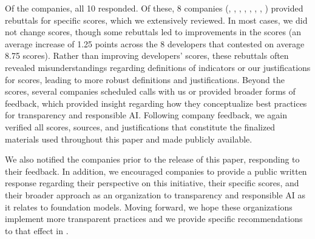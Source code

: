 Of the \numcompanies companies, all 10 responded.
Of these, 8 companies (\amazon, \anthropic, \cohere, \huggingface, \inflection, \meta, \openai, \stability) provided rebuttals for specific scores, which we extensively reviewed. 
In most cases, we did not change scores, though some rebuttals led to improvements in the scores (an average increase of 1.25 points across the 8 developers that contested on average 8.75 scores).
Rather than improving developers' scores, these rebuttals often revealed misunderstandings regarding definitions of indicators or our justifications for scores, leading to more robust definitions and justifications.
Beyond the scores, several companies scheduled calls with us or provided broader forms of feedback, which provided insight regarding how they conceptualize best practices for transparency and responsible AI.
Following company feedback, we again verified all scores, sources, and justifications that constitute the finalized materials used throughout this paper and made publicly available. 

We also notified the companies prior to the release of this paper, responding to their feedback. 
In addition, we encouraged companies to provide a public written response regarding their perspective on this initiative, their specific scores, and their broader approach as an organization to transparency and responsible AI as it relates to foundation models.
Moving forward, we hope these organizations implement more transparent practices and we provide specific recommendations to that effect in .
\clearpage